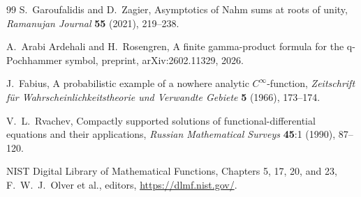 \documentclass[11pt,letterpaper,oneside,openany]{book}
\theoremstyle{definition}
\theoremstyle{remark}
\begin{document}
\begin{thebibliography}{99}
S.~Garoufalidis and D.~Zagier,
Asymptotics of Nahm sums at roots of unity,
\emph{Ramanujan Journal} \textbf{55} (2021), 219--238.

A.~Arabi Ardehali and H.~Rosengren,
A finite gamma-product formula for the q-Pochhammer symbol,
preprint, arXiv:2602.11329, 2026.

J.~Fabius,
A probabilistic example of a nowhere analytic \(C^\infty\)-function,
\emph{Zeitschrift f\"ur Wahrscheinlichkeitstheorie und Verwandte Gebiete}
\textbf{5} (1966), 173--174.

V.~L.~Rvachev,
Compactly supported solutions of functional-differential equations and their
applications,
\emph{Russian Mathematical Surveys} \textbf{45}:1 (1990), 87--120.

NIST Digital Library of Mathematical Functions,
Chapters 5, 17, 20, and 23,
F.~W.~J.~Olver et al., editors,
\url{https://dlmf.nist.gov/}.

\end{thebibliography}
\end{document}
